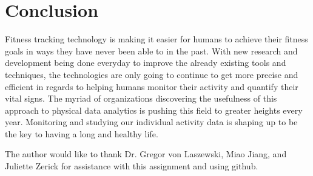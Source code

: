 \documentclass[sigconf]{acmart}
\begin{document}
\section{Conclusion}

Fitness tracking technology is making it easier for humans to achieve their fitness goals in ways they have never been able to in the past. With new research and development being done everyday to improve the already existing tools and techniques, the technologies are only going to continue to get more precise and efficient in regards to helping humans monitor their activity and quantify their vital signs. The myriad of organizations discovering the usefulness of this approach to physical data analytics is pushing this field to greater heights every year. Monitoring and studying our individual activity data is shaping up to be the key to having a long and healthy life.

\begin{acks}

  The author would like to thank Dr. Gregor von Laszewski, Miao Jiang, and Juliette Zerick for assistance with this assignment and using github.

\end{acks}



 




\end{document}
